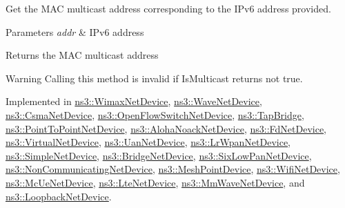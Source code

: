 Get the M\+AC multicast address corresponding to the I\+Pv6 address provided. 


\begin{DoxyParams}{Parameters}
{\em addr} & I\+Pv6 address \\
\hline
\end{DoxyParams}
\begin{DoxyReturn}{Returns}
the M\+AC multicast address 
\end{DoxyReturn}
\begin{DoxyWarning}{Warning}
Calling this method is invalid if Is\+Multicast returns not true. 
\end{DoxyWarning}


Implemented in \hyperlink{classns3_1_1WimaxNetDevice_a22b3e2e4c4b1e3c745a7ee40284d0347}{ns3\+::\+Wimax\+Net\+Device}, \hyperlink{classns3_1_1WaveNetDevice_a26c4774de7786f9ca29d7e07270770f1}{ns3\+::\+Wave\+Net\+Device}, \hyperlink{classns3_1_1CsmaNetDevice_ac3944d8c8399743a25b9919512912f62}{ns3\+::\+Csma\+Net\+Device}, \hyperlink{classns3_1_1OpenFlowSwitchNetDevice_a716719d59dbef8d0c1d67e24f566e97d}{ns3\+::\+Open\+Flow\+Switch\+Net\+Device}, \hyperlink{classns3_1_1TapBridge_a2ebaad85807dd1d2fc8a354a46c69076}{ns3\+::\+Tap\+Bridge}, \hyperlink{classns3_1_1PointToPointNetDevice_a0a85684446e32ff38014de0f6e9026cc}{ns3\+::\+Point\+To\+Point\+Net\+Device}, \hyperlink{classns3_1_1AlohaNoackNetDevice_a3279afb4f10d41f26e5611f884364168}{ns3\+::\+Aloha\+Noack\+Net\+Device}, \hyperlink{classns3_1_1FdNetDevice_a174a683ff194065093e8a9f1b496207a}{ns3\+::\+Fd\+Net\+Device}, \hyperlink{classns3_1_1VirtualNetDevice_aa35482ffe0c1a6e0a13adf1ab2f7999e}{ns3\+::\+Virtual\+Net\+Device}, \hyperlink{classns3_1_1UanNetDevice_ace5aeef735e5b5d314a4c9a3802c244b}{ns3\+::\+Uan\+Net\+Device}, \hyperlink{classns3_1_1LrWpanNetDevice_a3ff7d4252aa49a3cdd94a2b628bc32bc}{ns3\+::\+Lr\+Wpan\+Net\+Device}, \hyperlink{classns3_1_1SimpleNetDevice_aa68f34d64eb2bb2c134cc78e8e4fc78e}{ns3\+::\+Simple\+Net\+Device}, \hyperlink{classns3_1_1BridgeNetDevice_aa6d896c3ead0f292d2c85a5f69d5438b}{ns3\+::\+Bridge\+Net\+Device}, \hyperlink{classns3_1_1SixLowPanNetDevice_ac22bc87ffcd3c9b15a52c79da88b9edb}{ns3\+::\+Six\+Low\+Pan\+Net\+Device}, \hyperlink{classns3_1_1NonCommunicatingNetDevice_adafb215c0e61dd4cf8ae69521503a98d}{ns3\+::\+Non\+Communicating\+Net\+Device}, \hyperlink{classns3_1_1MeshPointDevice_a0aca6b73801fffd0ca00661a8dfbda7b}{ns3\+::\+Mesh\+Point\+Device}, \hyperlink{classns3_1_1WifiNetDevice_a688e6e8cf8e14d5dbb22b21768853ceb}{ns3\+::\+Wifi\+Net\+Device}, \hyperlink{classns3_1_1McUeNetDevice_a160536271785368ec43ae0f0104c12a3}{ns3\+::\+Mc\+Ue\+Net\+Device}, \hyperlink{classns3_1_1LteNetDevice_afe8f8834eb36de888d5d6e02805c444c}{ns3\+::\+Lte\+Net\+Device}, \hyperlink{classns3_1_1MmWaveNetDevice_ac5046b96c2d3f3dcacdcbdace5e6bd24}{ns3\+::\+Mm\+Wave\+Net\+Device}, and \hyperlink{classns3_1_1LoopbackNetDevice_a5533dda5ad3085b3597aca7d9b05ab38}{ns3\+::\+Loopback\+Net\+Device}.

